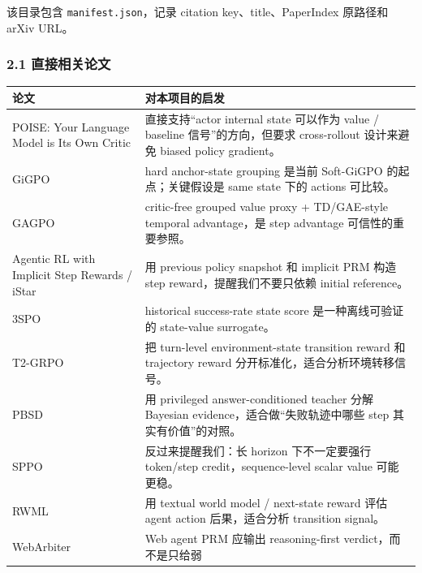 \documentclass[
  10pt,
]{ctexart}
\newcounter{none} %
\begin{document}
该目录包含 \texttt{manifest.json}，记录 citation key、title、PaperIndex
原路径和 arXiv URL。

\subsubsection{2.1
直接相关论文}\label{ux76f4ux63a5ux76f8ux5173ux8bbaux6587}

{\def\LTcaptype{none} %
\begin{longtable}[]{@{}
  >{\raggedright\arraybackslash}p{}
  >{\raggedright\arraybackslash}p{}@{}}
\toprule\noalign{}
\begin{minipage}[b]{\linewidth}\raggedright
论文
\end{minipage} & \begin{minipage}[b]{\linewidth}\raggedright
对本项目的启发
\end{minipage} \\
\midrule\noalign{}
\endhead
\bottomrule\noalign{}
\endlastfoot
POISE: Your Language Model is Its Own Critic & 直接支持``actor internal
state 可以作为 value / baseline 信号''的方向，但要求 cross-rollout
设计来避免 biased policy gradient。 \\
GiGPO & hard anchor-state grouping 是当前 Soft-GiGPO 的起点；关键假设是
same state 下的 actions 可比较。 \\
GAGPO & critic-free grouped value proxy + TD/GAE-style temporal
advantage，是 step advantage 可信性的重要参照。 \\
Agentic RL with Implicit Step Rewards / iStar & 用 previous policy
snapshot 和 implicit PRM 构造 step reward，提醒我们不要只依赖 initial
reference。 \\
3SPO & historical success-rate state score 是一种离线可验证的
state-value surrogate。 \\
T2-GRPO & 把 turn-level environment-state transition reward 和
trajectory reward 分开标准化，适合分析环境转移信号。 \\
PBSD & 用 privileged answer-conditioned teacher 分解 Bayesian
evidence，适合做``失败轨迹中哪些 step 其实有价值''的对照。 \\
SPPO & 反过来提醒我们：长 horizon 下不一定要强行 token/step
credit，sequence-level scalar value 可能更稳。 \\
RWML & 用 textual world model / next-state reward 评估 agent action
后果，适合分析 transition signal。 \\
WebArbiter & Web agent PRM 应输出 reasoning-first verdict，而不是只给弱

\end{longtable}}
\end{document}
